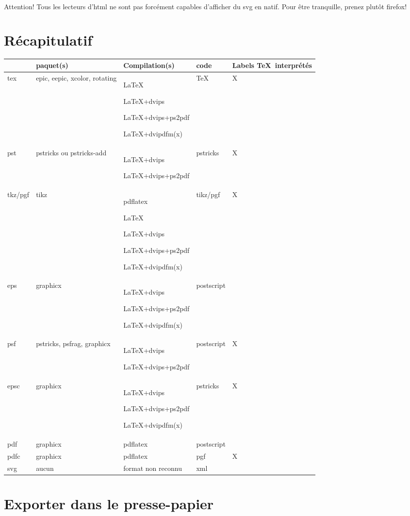 Attention! Tous les lecteurs d'html ne sont pas forcément capables d'afficher du svg en natif. Pour être tranquille, prenez plutôt firefox!

\section{Récapitulatif}

\begin{center}
\ifhtml\begin{tabular}{|m{1cm}|m{2cm}|m{4cm}|m{2cm}|m{2cm}|}%
\else\begin{tabular}{|c|c|m{4cm}|c|c|}\fi%
\hline
Export&\hfil paquet(s)\hfil&\hfil Compilation(s)\hfil&code&Labels \TeX\ interprétés\\\hline
tex& 
epic, eepic, xcolor, rotating&
\LaTeX \par \LaTeX+dvips \par \LaTeX+dvips+ps2pdf \par \LaTeX+dvipdfm(x)&
\TeX&X\\\hline 
pst&
pstricks ou pstricks-add&
\LaTeX+dvips \par \LaTeX+dvips+ps2pdf&
pstricks&X\\\hline
tkz/pgf&tikz&
pdflatex\par \LaTeX \par \LaTeX+dvips \par \LaTeX+dvips+ps2pdf \par \LaTeX+dvipdfm(x)&
tikz/pgf&X\\\hline
eps&
graphicx&
\LaTeX+dvips \par \LaTeX+dvips+ps2pdf \par \LaTeX+dvipdfm(x)&
postscript&\\\hline
psf&pstricks, psfrag, graphicx&
\LaTeX+dvips \par \LaTeX+dvips+ps2pdf&
postscript&X\\\hline
epsc&graphicx&\LaTeX+dvips \par \LaTeX+dvips+ps2pdf \par \LaTeX+dvipdfm(x)&
pstricks&X\\\hline
pdf&graphicx&pdflatex&postscript&\\\hline
pdfc&graphicx&pdflatex&pgf&X\\\hline
svg&aucun&format non reconnu&xml&\\\hline
\end{tabular}
\end{center}

\section{Exporter dans le presse-papier}

